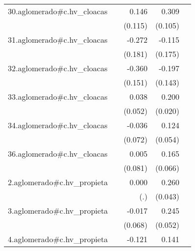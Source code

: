 {\begin{longtable}{l*{4}{D{.}{.}{-1}}}
\addlinespace
30.aglomerado#c.hv\_cloacas&                     &       0.146         &       0.309\sym{**} &                     \\
            &                     &     (0.115)         &     (0.105)         &                     \\
\addlinespace
31.aglomerado#c.hv\_cloacas&                     &      -0.272         &      -0.115         &                     \\
            &                     &     (0.181)         &     (0.175)         &                     \\
\addlinespace
32.aglomerado#c.hv\_cloacas&                     &      -0.360\sym{*}  &      -0.197         &                     \\
            &                     &     (0.151)         &     (0.143)         &                     \\
\addlinespace
33.aglomerado#c.hv\_cloacas&                     &       0.038         &       0.200\sym{***}&                     \\
            &                     &     (0.052)         &     (0.020)         &                     \\
\addlinespace
34.aglomerado#c.hv\_cloacas&                     &      -0.036         &       0.124\sym{*}  &                     \\
            &                     &     (0.072)         &     (0.054)         &                     \\
\addlinespace
36.aglomerado#c.hv\_cloacas&                     &       0.005         &       0.165\sym{*}  &                     \\
            &                     &     (0.081)         &     (0.066)         &                     \\
\addlinespace
2.aglomerado#c.hv\_propieta&                     &       0.000         &       0.260\sym{***}&                     \\
            &                     &         (.)         &     (0.043)         &                     \\
\addlinespace
3.aglomerado#c.hv\_propieta&                     &      -0.017         &       0.245\sym{***}&                     \\
            &                     &     (0.068)         &     (0.052)         &                     \\
\addlinespace
4.aglomerado#c.hv\_propieta&                     &      -0.121\sym{*}  &       0.141\sym{***}&                     \\

\end{longtable}}

